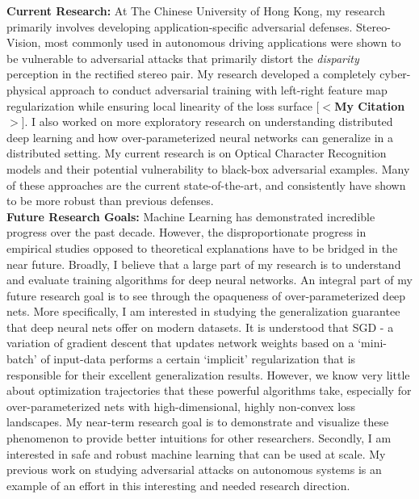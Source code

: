 \documentclass[12pt]{article}
\begin{document}
\textbf{Current Research:} At The Chinese University of Hong Kong, my research primarily involves developing application-specific adversarial defenses. Stereo-Vision, most commonly used in autonomous driving applications were shown to be vulnerable to adversarial attacks that primarily distort the \emph{disparity} perception in the rectified stereo pair. My research developed a completely cyber-physical approach to conduct adversarial training with left-right feature map regularization while ensuring local linearity of the loss surface [\textbf{$<$My Citation$>$}]. I also worked on more exploratory research on understanding distributed deep learning and how over-parameterized neural networks can generalize in a distributed setting. My current research is on Optical Character Recognition models and their potential vulnerability to black-box adversarial examples. Many of these approaches are the current state-of-the-art, and consistently have shown to be more robust than previous defenses.  \\

\textbf{Future Research Goals:} Machine Learning has demonstrated incredible progress over the past decade. However, the disproportionate progress in empirical studies opposed to theoretical explanations have to be bridged in the near future. Broadly, I believe that a large part of my research is to understand and evaluate training algorithms for deep neural networks. An integral part of my future research goal is to see through the opaqueness of over-parameterized deep nets. More specifically, I am interested in studying the generalization guarantee that deep neural nets offer on modern datasets. It is understood that SGD - a variation of gradient descent that updates network weights based on a `mini-batch' of input-data performs a certain `implicit' regularization that is responsible for their excellent generalization results. However, we know very little about optimization trajectories that these powerful algorithms take, especially for over-parameterized nets with high-dimensional, highly non-convex loss landscapes. My near-term research goal is to demonstrate and visualize these phenomenon to provide better intuitions for other researchers. Secondly, I am interested in safe and robust machine learning that can be used at scale. My previous work on studying adversarial attacks on autonomous systems is an example of an effort in this interesting and needed research direction. 


\end{document}
